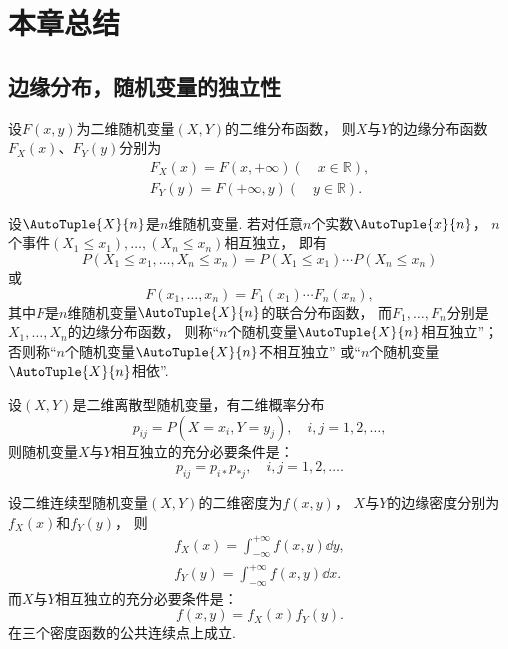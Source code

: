 \section{本章总结}
\subsection*{边缘分布，随机变量的独立性}
设\(F(x,y)\)为二维随机变量\((X,Y)\)的二维分布函数，
则\(X\)与\(Y\)的边缘分布函数\(F_X(x)\)、\(F_Y(y)\)分别为\begin{gather*}
	F_X(x) = F(x,+\infty)
	(\quad x \in \mathbb{R}), \\
	F_Y(y) = F(+\infty,y)
	(\quad y \in \mathbb{R}).
\end{gather*}

设\(\AutoTuple{X}{n}\)是\(n\)维随机变量.
若对任意\(n\)个实数\(\AutoTuple{x}{n}\)，
\(n\)个事件\((X_1 \leq x_1),\dotsc,(X_n \leq x_n)\)相互独立，
即有\[
	P(X_1 \leq x_1,\dotsc,X_n \leq x_n)
	= P(X_1 \leq x_1) \dotsm P(X_n \leq x_n)
\]
或\[
	F(x_1,\dotsc,x_n)
	= F_1(x_1) \dotsm F_n(x_n),
\]
其中\(F\)是\(n\)维随机变量\(\AutoTuple{X}{n}\)的联合分布函数，
而\(F_1,\dotsc,F_n\)分别是\(X_1,\dotsc,X_n\)的边缘分布函数，
则称“\(n\)个随机变量\(\AutoTuple{X}{n}\)相互独立”；
否则称“\(n\)个随机变量\(\AutoTuple{X}{n}\)不相互独立”
或“\(n\)个随机变量\(\AutoTuple{X}{n}\)相依”.

设\((X,Y)\)是二维离散型随机变量，有二维概率分布\[
	p_{ij} = P(X=x_i,Y=y_j), \quad i,j=1,2,\dotsc,
\]
则随机变量\(X\)与\(Y\)相互独立的充分必要条件是：\[
	p_{ij} = p_{i*} p_{*j}, \quad i,j=1,2,\dotsc.
\]

设二维连续型随机变量\((X,Y)\)的二维密度为\(f(x,y)\)，
\(X\)与\(Y\)的边缘密度分别为\(f_X(x)\)和\(f_Y(y)\)，
则\begin{align*}
	f_X(x) = \int_{-\infty}^{+\infty} f(x,y) \dd{y}, \\
	f_Y(y) = \int_{-\infty}^{+\infty} f(x,y) \dd{x}.
\end{align*}
而\(X\)与\(Y\)相互独立的充分必要条件是：\[
	f(x,y) = f_X(x) f_Y(y).
\]在三个密度函数的公共连续点上成立.

